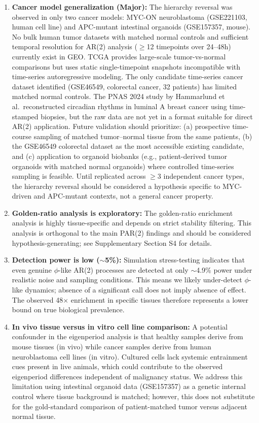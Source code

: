 \documentclass[11pt,a4paper]{article}
\begin{document}
\begin{enumerate}
    \item \textbf{Cancer model generalization (Major):} The hierarchy reversal was observed in only two cancer models: MYC-ON neuroblastoma (GSE221103, human cell line) and APC-mutant intestinal organoids (GSE157357, mouse). No bulk human tumor datasets with matched normal controls and sufficient temporal resolution for AR(2) analysis ($\geq$12 timepoints over 24--48h) currently exist in GEO. TCGA provides large-scale tumor-vs-normal comparisons but uses static single-timepoint snapshots incompatible with time-series autoregressive modeling. The only candidate time-series cancer dataset identified (GSE46549, colorectal cancer, 32 patients) has limited matched normal controls. The PNAS 2024 study by Hammarlund et al.\ reconstructed circadian rhythms in luminal A breast cancer using time-stamped biopsies, but the raw data are not yet in a format suitable for direct AR(2) application. Future validation should prioritize: (a) prospective time-course sampling of matched tumor--normal tissue from the same patients, (b) the GSE46549 colorectal dataset as the most accessible existing candidate, and (c) application to organoid biobanks (e.g., patient-derived tumor organoids with matched normal organoids) where controlled time-series sampling is feasible. Until replicated across $\geq$3 independent cancer types, the hierarchy reversal should be considered a hypothesis specific to MYC-driven and APC-mutant contexts, not a general cancer property.
    
    \item \textbf{Golden-ratio analysis is exploratory:} The golden-ratio enrichment analysis is highly tissue-specific and depends on strict stability filtering. This analysis is orthogonal to the main PAR(2) findings and should be considered hypothesis-generating; see Supplementary Section S4 for details.
    
    \item \textbf{Detection power is low ($\sim$5\%):} Simulation stress-testing indicates that even genuine $\phi$-like AR(2) processes are detected at only $\sim$4.9\% power under realistic noise and sampling conditions. This means we likely under-detect $\phi$-like dynamics; absence of a significant call does not imply absence of effect. The observed 48$\times$ enrichment in specific tissues therefore represents a lower bound on true biological prevalence.
    
    \item \textbf{In vivo tissue versus in vitro cell line comparison:} A potential confounder in the eigenperiod analysis is that healthy samples derive from mouse tissues (in vivo) while cancer samples derive from human neuroblastoma cell lines (in vitro). Cultured cells lack systemic entrainment cues present in live animals, which could contribute to the observed eigenperiod differences independent of malignancy status. We address this limitation using intestinal organoid data (GSE157357) as a genetic internal control where tissue background is matched; however, this does not substitute for the gold-standard comparison of patient-matched tumor versus adjacent normal tissue.
    

\end{enumerate}
\end{document}
